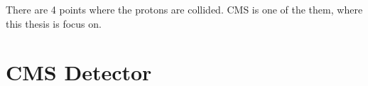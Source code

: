 There are 4 points where the protons are collided. CMS is one of the them, where this thesis is focus on.  
%
%
%
%
%
%
%

%
%
%

%
%
%
\section{CMS Detector}

